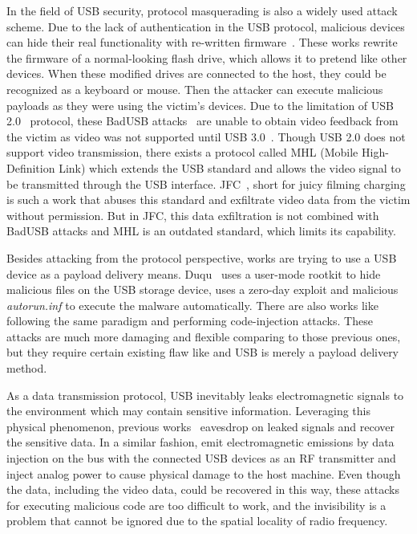 In the field of USB security, protocol masquerading is also a widely used
attack scheme. Due to the lack of authentication in the USB protocol, malicious
devices can hide their real functionality with re-written
firmware~\cite{rubber,badusb,rubberducky2020,usbbypassing,iseeyou,usbdriver}.
These works rewrite the firmware of a normal-looking flash drive, which allows
it to pretend like other devices. When these modified drives are connected to the
host, they could be recognized as a keyboard or mouse. Then the attacker can
execute malicious payloads as they were using the victim's devices. Due to the
limitation of USB 2.0~\cite{usb20} protocol, these BadUSB
attacks~\cite{badusb} are unable to obtain video feedback from the victim
as video was not supported until USB 3.0~\cite{usb30}. Though USB 2.0 does not
support video transmission, there exists a protocol called MHL (Mobile
High-Definition Link) which extends the USB standard and allows the video signal to
be transmitted through the USB interface. JFC~\cite{JFC}, short for juicy filming
charging is such a work that abuses this standard and exfiltrate video data
from the victim without permission. But in JFC, this data exfiltration is not
combined with BadUSB attacks and MHL is an outdated standard, which limits its
capability.

Besides attacking from the protocol perspective, works are trying to use a
USB device as a payload delivery means. Duqu~\cite{duqu} uses a user-mode
rootkit to hide malicious files on the USB storage device, \cite{flame} uses a
zero-day exploit and malicious \textit{autorun.inf} to execute the malware
automatically. There are also works like \cite{brain,stuxnet,conficker}
following the same paradigm and performing code-injection attacks. These
attacks are much more damaging and flexible comparing to those previous ones,
but they require certain existing flaw like \cite{zero-day} and USB is merely
a payload delivery method.

As a data transmission protocol, USB inevitably leaks electromagnetic signals
to the environment which may contain sensitive information. Leveraging this
physical phenomenon, previous works~\cite{smartphone,
poweremi,revealing,su2017usb,usbgpslocator,bates2014leveraging,badusbhub,usbfinger,side,usbdriver}
eavesdrop on leaked signals and recover the sensitive data. In a similar fashion,
\cite{usbee,turnip} emit electromagnetic emissions by data injection on the bus
with the connected USB devices as an RF transmitter and \cite{usbkiller,cable}
inject analog
power to cause physical damage to the host machine. Even though the data,
including the video data, could be recovered in this way, these attacks for
executing malicious code are too difficult to work, and the invisibility is a
problem that cannot be ignored due to the spatial locality of radio frequency.

